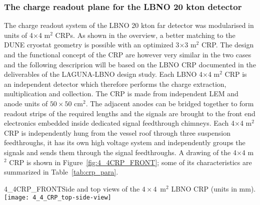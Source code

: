 \subsubsection{The charge readout plane for the LBNO 20 kton detector}

The charge readout system of the LBNO 20 kton far detector was modularised in units of 4$\times$4 m$^2$ CRPs. As shown in the overview, a better matching to the DUNE cryostat geometry is possible with an optimized  3$\times$3 m$^2$ CRP. The design and the functional concept of the CRP are however very similar in the two cases and the following descriprion will be based on the LBNO CRP documented in the deliverables of the LAGUNA-LBNO design study.  Each LBNO 4$\times$4 m$^2$ CRP is an independent detector which therefore performs the charge  extraction, multiplication and collection. The CRP is made from   independent LEM and anode units of $50\times50$ cm$^2$. The  adjacent anodes can be bridged together to form readout strips of the required lengths and the signals are brought to the front end  electronics embedded inside dedicated signal feedthrough  chimneys. Each 4$\times$4 m$^2$ CRP is independently hung from the vessel roof through three suspension feedthroughs, it has its own high voltage system and independently groups the signals and sends  them through the signal feedthroughs. A drawing of the 4$\times$4   m$^2$ CRP is shown in Figure~\ref{fig:4_4CRP_FRONT}; some of its characteristics are summarized in Table~\ref{tab:crp_para}.

\begin{cdrfigure}{4_4CRP_FRONT}{Side and top views of the $4\times4$~m$^2$ LBNO CRP (units in mm).}
 \texttt{[image: 4\_4\_CRP\_top-side-view]}  
\end{cdrfigure}


